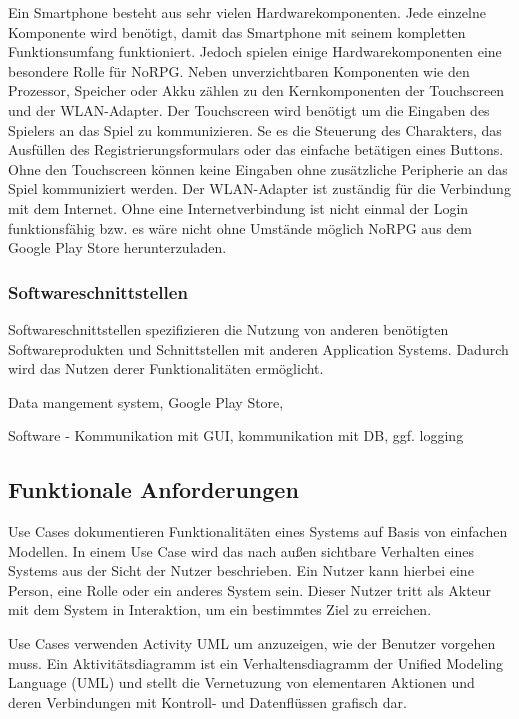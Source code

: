 			Ein Smartphone besteht aus sehr vielen Hardwarekomponenten. Jede einzelne Komponente wird benötigt, damit das Smartphone mit seinem kompletten Funktionsumfang funktioniert. Jedoch spielen einige Hardwarekomponenten eine besondere Rolle für NoRPG. Neben unverzichtbaren Komponenten wie den Prozessor, Speicher oder Akku zählen zu den Kernkomponenten der Touchscreen und der WLAN-Adapter.	Der Touchscreen wird benötigt um die Eingaben des Spielers an das Spiel zu kommunizieren. Se es die Steuerung des Charakters, das Ausfüllen des Registrierungsformulars oder das einfache betätigen eines Buttons. Ohne den Touchscreen können keine Eingaben ohne zusätzliche Peripherie an das Spiel kommuniziert werden. Der WLAN-Adapter ist zuständig für die Verbindung mit dem Internet. Ohne eine Internetverbindung ist nicht einmal der Login funktionsfähig bzw. es wäre nicht ohne Umstände möglich NoRPG aus dem Google Play Store herunterzuladen.
			
		\subsubsection{Softwareschnittstellen}
			Softwareschnittstellen spezifizieren die Nutzung von anderen benötigten Softwareprodukten und Schnittstellen mit anderen Application Systems. Dadurch wird das Nutzen derer Funktionalitäten ermöglicht.
			
			Data mangement system, Google Play Store, 
			
			Software - Kommunikation mit GUI, kommunikation mit DB, ggf. logging

	\subsection{Funktionale Anforderungen}
		Use Cases dokumentieren Funktionalitäten eines Systems auf Basis von einfachen Modellen. In einem Use Case wird das nach außen sichtbare Verhalten eines Systems aus der Sicht der Nutzer beschrieben. Ein Nutzer kann hierbei eine Person, eine Rolle oder ein anderes System sein. Dieser Nutzer tritt als Akteur mit dem System in Interaktion, um ein bestimmtes Ziel zu erreichen. %
		
		Use Cases verwenden Activity UML um anzuzeigen, wie der Benutzer vorgehen muss. Ein Aktivitätsdiagramm ist ein Verhaltensdiagramm der Unified Modeling Language (UML) und stellt die Vernetuzung von elementaren Aktionen und deren Verbindungen mit Kontroll- und Datenflüssen grafisch dar.
	

